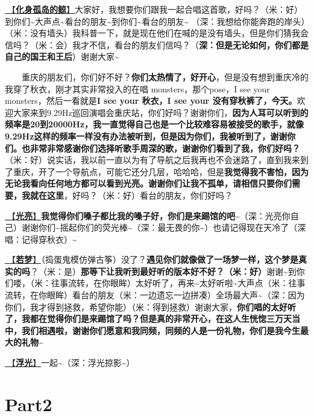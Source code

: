 \documentclass[]{ctexbook}
\begin{document}
\hyperref[hua-shen-gu-dao-de-jing]{🎵【\textbf{化身孤岛的鲸}】}大家好，我想要你们跟我一起合唱这首歌，好吗？（米：好）到你们\textasciitilde 大声点\textasciitilde 看台的朋友\textasciitilde 到你们\textasciitilde 看台的朋友\textasciitilde{}
（深：我想给你能奔跑的岸头）（米：没有墙头）我科普一下，就是现在他们在喊的是没有墙头，但是你们猜我会信吗？（米：会）我才不信，看台的朋友们信吗？（\textbf{深：但是无论如何，你们都是自己的国王和王后}）谢谢大家\textasciitilde{}

  重庆的朋友们，你们好不好？\textbf{你们太热情了，好开心}，但是没有想到重庆冷的我穿了秋衣，刚才其实非常投入的在唱 monsters，那个pose，I see your monsters，然后一看就是\textbf{I see your 秋衣，I see your 没有穿秋裤了，今天。}欢迎大家来到9.29Hz巡回演唱会重庆站，你们好吗？谢谢你们，\textbf{因为人耳可以听到的频率是20到20000Hz，我一直觉得自己也是一个比较难容易被接受的歌手，就像9.29Hz这样的频率一样没有办法被听到，但是因为你们，我被听到了，谢谢你们。也非常非常感谢你们选择听歌手周深的歌，谢谢你们看到了我，你们好吗？}（米：好）说实话，我以前一直以为有了导航之后我再也不会迷路了，直到我来到了重庆，开了一个导航点，可能它还分几层，哈哈哈，但是\textbf{我觉得我不害怕，因为无论我看向任何地方都可以看到光亮。谢谢你们让我不孤单，请相信只要你们需要，我就在这里}，好吗？（米：好）看台的朋友，你们好吗？

\hyperref[silver-linings]{🎵【\textbf{光亮}】}\textbf{我觉得你们嗓子都比我的嗓子好，你们是来踢馆的吧}\textasciitilde（深：光亮你自己）谢谢你们\textasciitilde 摇起你们的荧光棒\textasciitilde（深：最无畏的你\textasciitilde）也请记得现在天冷了（深唱：记得穿秋衣）\textasciitilde{}

\hyperref[ruomeng]{🎵【\textbf{若梦}】}（捣蛋鬼模仿弹古筝）没了？\textbf{遇见你们就像做了一场梦一样，这个梦是真实的吗}？（米：是）\textbf{那等下让我听到最好听的版本好不好？（米：好）}谢谢\textasciitilde 到你们喽，（米：往事流转，在你眼眸）太好听了，再来\textasciitilde 太好听啦\textasciitilde 大声点（米：往事流转，在你眼眸）看台的朋友（米：一边遗忘一边拼凑）全场最大声\textasciitilde（深：因为你们，我才得到拯救，希望你能）（米：得到拯救）谢谢大家，\textbf{你们唱的太好听了，我都在觉得你们是来踢馆了吗？但是真的非常开心，在这人生恍惚三万天当中，我们相遇啦，谢谢你们愿意和我同频，同频的人是一份礼物，你们是我今生最大的礼物\textasciitilde{}}

\hyperref[floating-light]{🎵【\textbf{浮光}】}一起\textasciitilde（深：浮光掠影\textasciitilde）

\section{Part2}\label{chongqing-20241006-part2}
\end{document}
